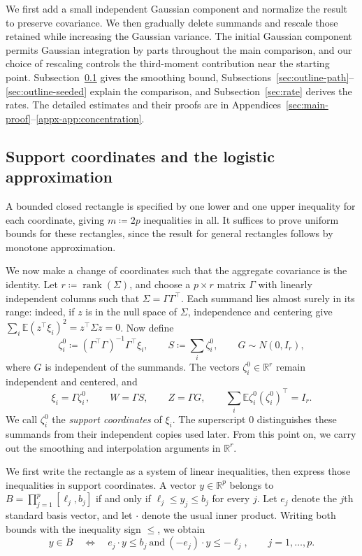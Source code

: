\documentclass[11pt,letterpaper]{article}
\theoremstyle{remark}
\newcommand{\E}{\mathbb E}
\newcommand{\R}{\mathbb R}
\begin{document}
We first add a small independent Gaussian component and normalize
the result to preserve covariance. We then gradually delete summands
and rescale those retained while increasing the Gaussian variance.
The initial Gaussian component permits Gaussian integration by parts
throughout the main comparison, and our choice of rescaling controls
the third-moment contribution near the starting point.
Subsection~\ref{sec:outline-smoothing} gives the smoothing bound,
Subsections~\ref{sec:outline-path}--\ref{sec:outline-seeded} explain
the comparison, and Subsection~\ref{sec:rate} derives the rates.
The detailed estimates and their proofs are in
Appendices~\ref{sec:main-proof}--\ref{appx-app:concentration}.


\subsection{Support coordinates and the logistic approximation}
\label{sec:outline-smoothing}

A bounded closed rectangle is specified by one lower and one upper
inequality for each coordinate, giving \(m\coloneqq2p\) inequalities
in all. It suffices to prove uniform bounds for these rectangles,
since the result for general rectangles follows by monotone approximation.

We now make a change of coordinates such that the aggregate covariance
is the identity. Let \(r\coloneqq\operatorname{rank}(\Sigma)\), and
choose a \(p\times r\) matrix \(\Gamma\) with linearly independent
columns such that \(\Sigma=\Gamma\Gamma^\top\). Each summand lies
almost surely in its range: indeed, if \(z\) is in the null space of
\(\Sigma\), independence and centering give
\(\sum_i\E(z^\top\xi_i)^2=z^\top\Sigma z=0\). Now define
\[
 \zeta_i^0\coloneqq(\Gamma^\top\Gamma)^{-1}\Gamma^\top\xi_i,
 \qquad S\coloneqq\sum_i\zeta_i^0,
 \qquad G\sim N(0,I_r),
\]
where \(G\) is independent of the summands. The vectors
\(\zeta_i^0\in\R^r\) remain independent and centered, and
\[
 \xi_i=\Gamma\zeta_i^0,\qquad
 W=\Gamma S,\qquad Z=\Gamma G,\qquad
 \sum_i\E\zeta_i^0(\zeta_i^0)^\top=I_r.
\]
We call \(\zeta_i^0\) the \emph{support coordinates} of \(\xi_i\).
The superscript \(0\) distinguishes these summands from their
independent copies used later. From this point on, we carry out the
smoothing and interpolation arguments in \(\R^r\).

We first write the rectangle as a system of linear inequalities, then
express those inequalities in support coordinates. A vector
\(y\in\R^p\) belongs to \(B=\prod_{j=1}^p[\ell_j,b_j]\) if and
only if \(\ell_j\le y_j\le b_j\) for every \(j\). Let \(e_j\)
denote the \(j\)th standard basis vector, and let \(\cdot\) denote
the usual inner product. Writing both bounds with the inequality
sign \(\le\), we obtain
\[
 y\in B\quad\Longleftrightarrow\quad
 e_j\cdot y\le b_j\ \text{and}\ (-e_j)\cdot y\le-\ell_j,
 \qquad j=1,\ldots,p.
\]
\end{document}
